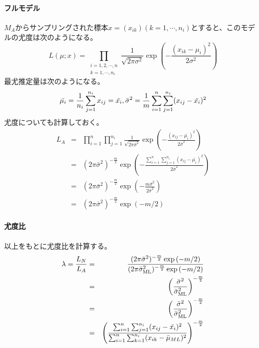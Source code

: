 \paragraph{フルモデル}
$M_A$からサンプリングされた標本$x = (x_{ik}) (k=1,\cdots,n_i)$とすると、このモデルの尤度は次のようになる。
\begin{equation*}
    L(\mu;x) = \prod_{\substack{i=1,2,\cdots,n \\ k=1,\cdots,n_i}}\frac{1}{\sqrt{2\pi\sigma^2}}\exp(-\frac{(x_{ik}-\mu_i)^2}{2\sigma^2})
\end{equation*}
最尤推定量は次のようになる。
\begin{equation*}
 \bar{\mu_i} = \frac{1}{n_i}\sum_{j=1}^{n_i} x_{ij} = \bar{x_i},\\
 \bar{\sigma}^2 = \frac{1}{m} \sum_{i=1}^n \sum_{j=1}^{n_i} (x_{ij}-\bar{x_i})^2
\end{equation*}
尤度についても計算しておく。
\begin{eqnarray*}\label{anova_model_likelihood}
 L_A &=& \prod_{i=1}^n \prod_{j=1}^{n_i}\frac{1}{\sqrt{2\pi \bar{\sigma}^2}}\exp\left(  -\frac{(x_{ij}-\bar{\mu_i})^2}{2 \bar{\sigma}^2}\right) \\
 &=&  (2\pi \bar{\sigma}^2)^{-\frac{m}{2}}\exp\left(  -\frac{\sum_{i=1}^n \sum_{j=1}^{n_i} (x_{ij}-\bar{\mu_i})^2}{2 \bar{\sigma}^2}\right) \\
 &=&  (2\pi \bar{\sigma}^2)^{-\frac{m}{2}}\exp\left(  -\frac{ m \bar{\sigma}^2}{ 2\bar{\sigma}^2}\right) \\
 &=&  (2\pi \bar{\sigma}^2)^{-\frac{m}{2} }\exp\left(  -m/2\right) 
\end{eqnarray*}

\paragraph{尤度比}
以上をもとに尤度比を計算する。
\begin{eqnarray*}
 \lambda =\frac{L_N}{L_A} &=& \frac{(2\pi \bar{\sigma}^2)^{-\frac{m}{2} }\exp\left(  -m/2\right) }{  (2\pi \bar{\sigma}^2_{\rm{ML}})^{-\frac{m}{2} }\exp\left(  -m/2\right)  }\\
 &=& \left( \frac{ \bar{\sigma}^2}{ \bar{\sigma}^2_{\rm{ML}} }\right)^{-\frac{m}{2}}\\
 &=& \left( \frac{ \bar{\sigma}^2}{ \bar{\sigma}^2_{\rm{ML}} }\right)^{-\frac{m}{2}} \\
&=& \left( \frac{ \sum_{i=1}^n \sum_{j=1}^{n_i} (x_{ij}-\bar{x_i})^2 }{ \sum_{i=1}^n \sum_{k=1}^{n_i}(x_{ik} -\bar{\mu}_{ML})^2 } \right)^{-\frac{m}{2}}
\end{eqnarray*}


